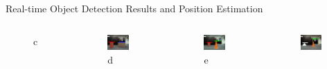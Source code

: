 \documentclass[10pt]{beamer}
\begin{document}
\begin{frame}{Real-time Object Detection Results and Position Estimation}
\begin{columns}
\begin{figure}
         \caption{c}
     \end{figure}
     \vspace{-20pt}
     \begin{figure}
         \centering
         \includegraphics[width=0.8\textwidth]{Images/cy_d85cm_box_d95cm.PNG}
         \caption{d}
     \end{figure}
     \begin{figure}
         \centering
         \includegraphics[width=0.8\textwidth]{Images/cy_d120cm_TC_d70cm.PNG}
         \caption{e}
     \end{figure}
     \vspace{-20pt}
     \begin{figure}
         \centering
         \includegraphics[width=0.8\textwidth]{Images/TC_d105cm_py_d155cm.PNG}

\end{figure}
\end{columns}
\end{frame}
\end{document}
